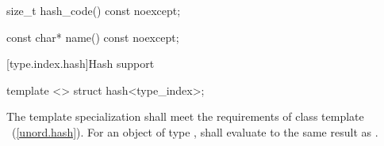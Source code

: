 \begin{itemdescr}
\pnum
\returns {}
\end{itemdescr}

%
%
\begin{itemdecl}
size_t hash_code() const noexcept;
\end{itemdecl}

\begin{itemdescr}
\pnum
\returns {}
\end{itemdescr}

%
%
\begin{itemdecl}
const char* name() const noexcept;
\end{itemdecl}

\begin{itemdescr}
\pnum
\returns {}
\end{itemdescr}

[type.index.hash]{Hash support}

%
\begin{itemdecl}
template <> struct hash<type_index>;
\end{itemdecl}

\begin{itemdescr}
\pnum
The template specialization shall meet the requirements of class template
~(\ref{unord.hash}). For an object  of type ,
 shall evaluate to the same result as .
\end{itemdescr}
